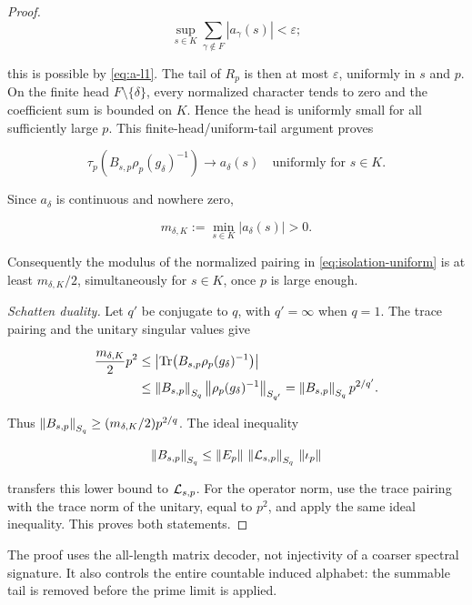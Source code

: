 \begin{proof}
\[
 \sup_{s\in K}\sum_{\gamma\notin F}|a_\gamma(s)|<\varepsilon;
\]

this is possible by \cref{eq:a-l1}.  The tail of \(R_p\) is then at most
\(\varepsilon\), uniformly in \(s\) and \(p\).  On the finite head
\(F\setminus\{\delta\}\), every normalized character tends to zero and the
coefficient sum is bounded on \(K\).  Hence the head is uniformly small for
all sufficiently large \(p\).  This finite-head/uniform-tail argument proves

\begin{equation}
 \tau_p\!\left(B_{s,p}\rho_p(g_\delta)^{-1}\right)
 \longrightarrow a_\delta(s)
 \quad\text{uniformly for }s\in K.
 \label{eq:isolation-uniform}
\end{equation}

Since \(a_\delta\) is continuous and nowhere zero,

\begin{equation}
 m_{\delta,K}:=\min_{s\in K}|a_\delta(s)|>0.
 \label{eq:m-delta}
\end{equation}

Consequently the modulus of the normalized pairing in
\cref{eq:isolation-uniform} is at least \(m_{\delta,K}/2\), simultaneously
for \(s\in K\), once \(p\) is large enough.

\emph{Schatten duality.}
Let \(q'\) be conjugate to \(q\), with \(q'=\infty\) when \(q=1\).
The trace pairing and the unitary singular values give

\begin{align}
 \frac{m_{\delta,K}}2p^2
 &\le
 \left|\operatorname{Tr}\!\left(B_{s,p}\rho_p(g_\delta)^{-1}\right)\right| \\
 &\le
 \left\lVert B_{s,p}\right\rVert_{S_{q}}
 \left\lVert\rho_p(g_\delta)^{-1}\right\rVert_{S_{q'}}
 =\left\lVert B_{s,p}\right\rVert_{S_{q}}p^{2/q'}.
 \label{eq:duality-lower}
\end{align}

Thus \(\left\lVert B_{s,p}\right\rVert_{S_{q}}\ge
(m_{\delta,K}/2)p^{2/q}\).  The ideal inequality

\[
 \left\lVert B_{s,p}\right\rVert_{S_{q}}
 \le\left\lVert E_p\right\rVert\,\left\lVert\mathcal L_{s,p}\right\rVert_{S_{q}}\,\left\lVert\iota_p\right\rVert
\]

transfers this lower bound to \(\mathcal L_{s,p}\).  For the operator norm, use
the trace pairing with the trace norm of the unitary, equal to \(p^2\), and
apply the same ideal inequality.  This proves both statements.
\end{proof}

The proof uses the all-length matrix decoder, not injectivity of a coarser
spectral signature.  It also controls the entire countable induced alphabet:
the summable tail is removed before the prime limit is applied.

